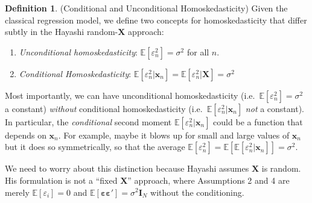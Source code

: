 \documentclass[12pt]{article}
\theoremstyle{plain}
\theoremstyle{definition}
\newtheorem{defn}[thm]{Definition}
\theoremstyle{remark}
\newcommand{\bsx}{\boldsymbol{x}}
\newcommand{\bsI}{\boldsymbol{I}}
\newcommand{\bsX}{\boldsymbol{X}}
\newcommand{\bsvarepsilon}{\boldsymbol{\varepsilon}}
\newcommand{\E}{\mathbb{E}}
\begin{document}
\clearpage
\begin{defn}(Conditional and Unconditional Homoskedasticity)
Given the classical regression model, we define two concepts for
homoskedasticity that differ subtly in the Hayashi random-$\bsX$
approach:
\begin{enumerate}
  \item \emph{Unconditional homoskedasticity}:
    $\E[\varepsilon_n^2] = \sigma^2$ for all $n$.
  \item \emph{Conditional Homoskedasticity}:
    $\E[\varepsilon_n^2 | \bsx_n]
    =\E[\varepsilon_n^2 | \bsX] = \sigma^2$
\end{enumerate}
Most importantly, we can have unconditional homoskedasticity
(i.e.\ $\E[\varepsilon_n^2]=\sigma^2$ a constant) \emph{without}
conditional homoskedasticity (i.e.\ $\E[\varepsilon_n^2|\bsx_n]$
\emph{not} a constant).  In particular, the \emph{conditional} second
moment $\E[\varepsilon_n^2|\bsx_n]$ could be a function that depends on
$\bsx_n$. For example, maybe it blows up for small and large values of
$\bsx_n$ but it does so symmetrically, so that the average
$\E[\varepsilon_n^2]=\E[\E[\varepsilon_n^2|\bsx_n]]=\sigma^2$.

We need to worry about this distinction because Hayashi assumes $\bsX$
is random. His formulation is not a ``fixed $\bsX$'' approach, where
Assumptions 2 and 4 are merely $\E[\varepsilon_i]=0$ and
$\E[\bsvarepsilon\bsvarepsilon']=\sigma^2\bsI_N$ without the
conditioning.
\end{defn}
\end{document}
